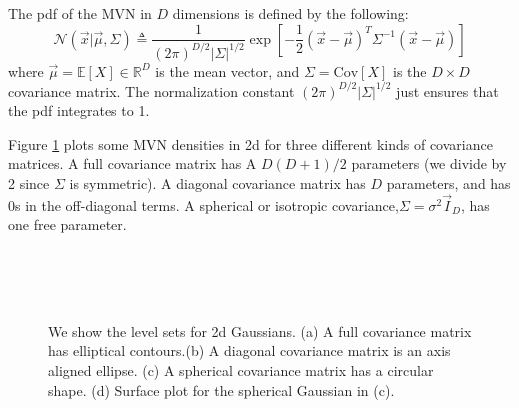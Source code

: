 The pdf of the MVN in $D$ dimensions is defined by the following:
\begin{equation}
\mathcal{N}(\vec{x}|\vec{\mu},\Sigma) \triangleq \dfrac{1}{(2\pi)^{D/2}|\Sigma|^{1/2}}\exp\left[-\dfrac{1}{2}(\vec{x}-\vec{\mu})^T\Sigma^{-1}(\vec{x}-\vec{\mu})\right]
\end{equation}
where $\vec{\mu}=\mathbb{E}[X] \in \mathbb{R}^D$ is the mean vector, and $\Sigma=\text{Cov}[X]$ is the $D \times D$ covariance matrix. The normalization constant $(2\pi)^{D/2}|\Sigma|^{1/2}$ just ensures that the pdf integrates to 1.

Figure \ref{fig:2d-Gaussions} plots some MVN densities in 2d for three different kinds of covariance matrices. A full covariance matrix has A $D(D+1)/2$ parameters (we divide by 2 since $\Sigma$ is symmetric). A diagonal covariance matrix has $D$ parameters, and has 0s in the off-diagonal terms. A spherical or isotropic covariance,$\Sigma=\sigma^2\vec{I}_D$, has one free parameter.

\begin{figure}[hbtp]
\centering
{} \\
 \\
 \\
\caption{We show the level sets for 2d Gaussians. (a) A full covariance matrix has elliptical contours.(b) A diagonal covariance matrix is an axis aligned ellipse. (c) A spherical covariance matrix has a circular shape. (d) Surface plot for the spherical Gaussian in (c).}
\label{fig:2d-Gaussions} 
\end{figure}


